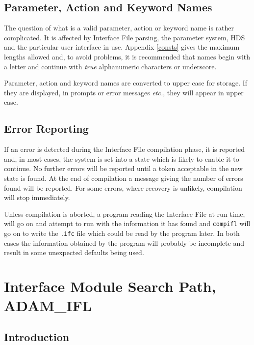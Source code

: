 \documentclass[twoside,11pt,nolof]{starlink}
\begin{document}
\subsection{Parameter, Action and Keyword Names
\label{names}}

The question of what is a valid parameter, action or keyword name is rather
complicated.
It is affected by Interface File parsing, the parameter system, HDS and the
particular user interface in use.
Appendix \ref{consts} gives the maximum lengths allowed and, to avoid problems,
it is recommended that names begin with a letter and continue with \emph{true}
alphanumeric characters or underscore.

Parameter, action and keyword names are converted to upper case for storage.
If they are displayed, in prompts or error messages \emph{etc.}, they will
appear in upper case.

\subsection{Error Reporting}

If an error is detected during the Interface File compilation phase, it is
reported and, in most cases, the system is set into a state which is likely
to enable it to continue.
No further errors will be reported until a token acceptable in the new state
is found. At the end of compilation a message giving the number of errors
found will be reported.
For some errors, where recovery is unlikely, compilation will stop immediately.

Unless compilation is aborted, a program reading the Interface File at run
time, will go on and attempt to run with the information it has found and
\texttt{compifl} will go on to write the \texttt{.ifc} file which could be read
by the program later.
In both cases the information obtained by the program will probably be
incomplete and result in some unexpected defaults being used.

\newpage

\section{Interface Module Search Path, ADAM\_IFL
\label{searchpath}}

\subsection{Introduction}
\end{document}

